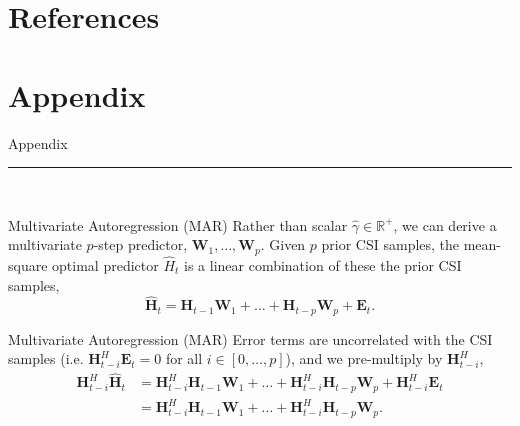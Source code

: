 \documentclass{beamer}
\begin{document}
\section*{References}

\section*{Appendix}

  \begin{frame}[plain]
    \vfill
    \centering
    \begin{beamercolorbox}[sep=8pt,center,shadow=true,rounded=true]{Appendix}
      \insertsectionhead\par%
      \color{davisblue}\noindent\rule{10cm}{1pt} \\
    \end{beamercolorbox}
    \vfill
  \end{frame} 

  \begin{frame}{Multivariate Autoregression (MAR)}
    Rather than scalar $\hat\gamma \in \mathbb R^+$, we can derive a multivariate $p$-step predictor, $\mathbf W_1, \dots, \mathbf W_p$.
    Given $p$ prior CSI samples, the mean-square optimal predictor
    $\hat H_t$ is a linear combination of these the prior CSI samples,
    \begin{equation}
    \mathbf{\hat H}_{t} = \mathbf{H}_{t-1} \mathbf W_{1} + \dots + \mathbf{H}_{t-p} \mathbf W_{p} + \mathbf E_t.
    \end{equation}
  \end{frame}

  \begin{frame}{Multivariate Autoregression (MAR)}
    Error terms are uncorrelated with the CSI samples
    (i.e. $\mathbf H_{t-i}^H \mathbf E_t = 0$ for all $i \in [0, \dots, p]$),
    and we pre-multiply by $\mathbf H_{t-i}^H$,
    \begin{align}
    \mathbf{H}_{t-i}^H\mathbf{\hat H}_{t} &= \mathbf{H}_{t-i}^H\mathbf{H}_{t-1} \mathbf W_{1} + \dots + \mathbf{H}_{t-i}^H\mathbf{H}_{t-p} \mathbf W_{p} + \mathbf{H}_{t-i}^H\mathbf E_t \nonumber \\
                        &= \mathbf{H}_{t-i}^H\mathbf{H}_{t-1} \mathbf W_{1} + \dots + \mathbf{H}_{t-i}^H\mathbf{H}_{t-p} \mathbf W_{p}. \label{eq:var-init}
    \end{align}
  \end{frame}
\end{document}
